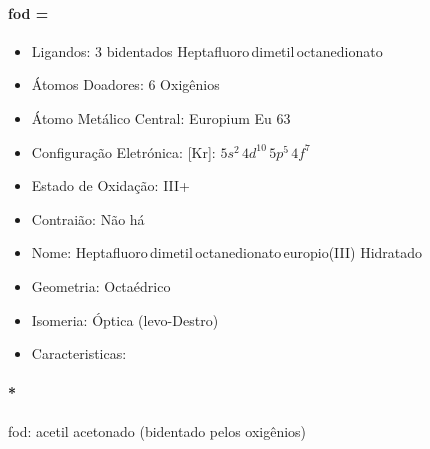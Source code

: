 \documentclass[12pt]{article}
\begin{document}
	\paragraph{fod =} 
	
	\begin{itemize}
   
	
   \item Ligandos: 
   	3 bidentados Heptafluoro\,dimetil\,octanedionato
   
	
   \item Átomos Doadores: 6 Oxigênios
   
   \item Átomo Metálico Central: Europium Eu 63
   
   \item Configuração Eletrónica: 
   	[Kr]: $ 5s^2\,4d^{10}\,5p^5\,4f^7 $
   
   \item Estado de Oxidação: III+
   
   \item Contraião: Não há
   
   \item Nome:
   	Heptafluoro\,dimetil\,octanedionato\,europio(III)
	 	Hidratado
   
   \item Geometria: Octaédrico
   
   \item Isomeria: Óptica (levo-Destro)

	\item Caracteristicas:

	\end{itemize}
		
\paragraph{*}
fod: acetil acetonado  (bidentado pelos oxigênios)
		
\break

	
\end{document}
